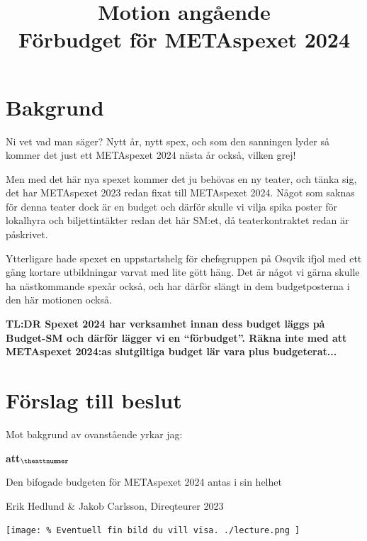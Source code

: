 \documentclass[a4paper]{article}
\title{\textcolor{cerise}{\textbf{
    Motion angående\\
    Förbudget för METAspexet 2024
}}}
\date{}
\begin{document}
\maketitle
\thispagestyle{fancy} %

\section*{\textcolor{cerise}{
    Bakgrund
}}

Ni vet vad man säger? Nytt år, nytt spex, och som den sanningen lyder så kommer det just ett METAspexet 2024 nästa år också, vilken grej!

Men med det här nya spexet kommer det ju behövas en ny teater, och tänka sig, det har METAspexet 2023 redan fixat till METAspexet 2024.
Något som saknas för denna teater dock är en budget och därför skulle vi vilja spika poster för lokalhyra och biljettintäkter redan det här SM:et,
då teaterkontraktet redan är påskrivet.

Ytterligare hade spexet en uppstartshelg för chefsgruppen på Osqvik ifjol med ett gäng kortare utbildningar varvat med lite gött häng. Det är något
vi gärna skulle ha nästkommande spexår också, och har därför slängt in dem budgetposterna i den här motionen också.

\textbf{TL:DR Spexet 2024 har verksamhet innan dess budget läggs på Budget-SM och därför lägger vi en ``förbudget''. Räkna inte med att METAspexet 2024:as slutgiltiga budget lär vara plus budgeterat...}

\section*{\textcolor{cerise}{
    Förslag till beslut
}}

	Mot bakgrund av ovanstående yrkar jag:

\setcounter{attnummer}{1}
\begin{list}{\bf att$_{\theattnummer}$}{}
\item Den bifogade budgeten för METAspexet 2024 antas i sin helhet
\end{list}

\vspace{2cm}
\noindent
Erik Hedlund \& Jakob Carlsson, Direqteurer 2023

\begin{center}
 \texttt{[image: 
    \% Eventuell fin bild du vill visa.
     ./lecture.png
 ]}
\end{center}
\end{document}
